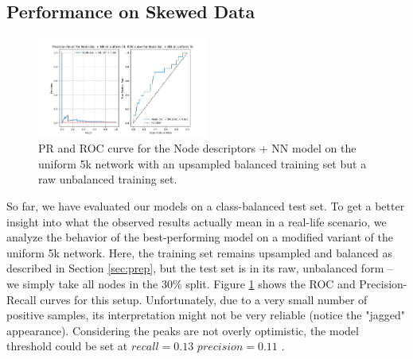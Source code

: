 \documentclass[9pt,twocolumn,twoside]{pnas-report}
\begin{document}
\subsection{Performance on Skewed Data}

\begin{figure}[htbp]
    \centering
    \includegraphics[width=0.5\textwidth]{fig/curves.png}
    \caption{PR and ROC curve for the Node descriptors + NN model on the uniform 5k network with an upsampled balanced training set but a raw unbalanced training set.}
    \label{fig:roc-unbalanced}
\end{figure}

So far, we have evaluated our models on a class-balanced test set. To get a better insight into what the observed results actually mean in a real-life scenario, we analyze the behavior of the best-performing model on a modified variant of the uniform 5k network. Here, the training set remains upsampled and balanced as described in Section \ref{sec:prep}, but the test set is in its raw, unbalanced form -- we simply take all nodes in the 30\% split. 
Figure \ref{fig:roc-unbalanced} shows the ROC and Precision-Recall curves for this setup. Unfortunately, due to a very small number of positive samples, its interpretation might not be very reliable (notice the "jagged" appearance).
Considering the peaks are not overly optimistic, the model threshold could be set at $recall=0.13$ $precision=0.11$ .
\end{document}
